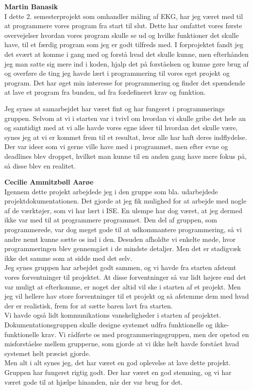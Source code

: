 \textbf{Martin Banasik}\\
I dette 2. semesterprojekt som omhandler måling af EKG, har jeg været med til at programmere vores program fra start til slut. Dette har omfattet vores første overvejelser hvordan vores program skulle se ud og hvilke funktioner det skulle have, til et færdig program som jeg er godt tilfreds med. I forprojektet fandt jeg det svært at komme i gang med og forstå hvad det skulle kunne, men efterhånden jeg man satte sig mere ind i koden, hjalp det på forståelsen og kunne gøre brug af og overføre de ting jeg havde lært i programmering til vores eget projekt og program. Det har øget min interesse for programmering og finder det spændende at lave et program fra bunden, ud fra fordefineret krav og funktion. 

Jeg synes at samarbejdet har været fint og har fungeret i programmerings gruppen. Selvom at vi i starten var i tvivl om hvordan vi skulle gribe det hele an og samtidigt med at vi alle havde vores egne ideer til hvordan det skulle være, synes jeg at vi er kommet frem til et resultat, hvor alle har haft deres indflydelse. Der var ideer som vi gerne ville have med i programmet, men efter evne og deadlines blev droppet, hvilket man kunne til en anden gang have mere fokus på, så disse blev en realitet. 

\textbf{Cecilie Ammitzbøll Aarøe}\\
Igennem dette projekt arbejdede jeg i den gruppe som bla. udarbejdede projektdokumentationen. Det gjorde at jeg fik mulighed for at arbejde med nogle af de værktøjer, som vi har lært i ISE. En ulempe har dog været, at jeg dermed ikke var med til at programmere programmet. Den del af gruppen, som programmerede, var dog meget gode til at udkommantere programmering, så vi andre nemt kunne sætte os ind i den. Desuden afholdte vi enkelte møde, hvor programmeringen blev gennemgået i de mindste detaljer. Men det er stadigvæk ikke det samme som at sidde med det selv.\\
Jeg synes gruppen har arbejdet godt sammen, og vi havde fra starten afstemt vores forventninger til projektet. At disse forventninger så var lidt højere end det var muligt at efterkomme, er noget der altid vil ske i starten af et projekt. Men jeg vil hellere hav store forventninger til et projekt og så afstemme dem med hvad der er realistisk, frem for at sætte baren lavt fra starten.\\
Vi havde også lidt kommunikations vanskeligheder i starten af projektet. Dokumentationsgruppen skulle designe systemet udfra funktionelle og ikke-funktionelle krav. Vi rådførte os med programmeringsgruppen, men der opstod en misforståelse mellem grupperne, som gjorde at vi ikke helt havde forstået hvad systemet helt præcist gjorde.\\
Men alt i alt synes jeg, det har været en god oplevelse at lave dette projekt. Gruppen har fungeret rigtig godt. Der har været en god stemning, og vi har været gode til at hjælpe hinanden, når der var brug for det.

